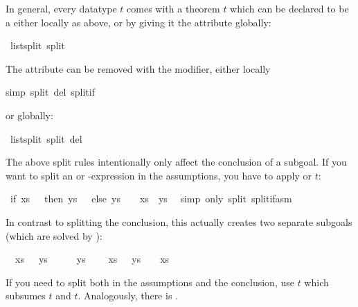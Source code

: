 \begin{isabellebody}
\begin{isamarkuptext}
In general, every datatype $t$ comes with a theorem
$t$ which can be declared to be a  either
locally as above, or by giving it the  attribute globally:%
\end{isamarkuptext}%
\ list{\isachardot}split\ {\isacharbrackleft}split{\isacharbrackright}%
\begin{isamarkuptext}%
\noindent
The  attribute can be removed with the  modifier,
either locally%
\end{isamarkuptext}%
simp\ split\ del{\isacharcolon}\ split{\isacharunderscore}if{\isacharparenright}%
\begin{isamarkuptext}%
\noindent
or globally:%
\end{isamarkuptext}%
\ list{\isachardot}split\ {\isacharbrackleft}split\ del{\isacharbrackright}%
\begin{isamarkuptext}%
The above split rules intentionally only affect the conclusion of a
subgoal.  If you want to split an  or -expression in
the assumptions, you have to apply  or
$t$:%
\end{isamarkuptext}%
\ {\isachardoublequote}if\ xs\ {\isacharequal}\ {\isacharbrackleft}{\isacharbrackright}\ then\ ys\ {\isachartilde}{\isacharequal}\ {\isacharbrackleft}{\isacharbrackright}\ else\ ys\ {\isacharequal}\ {\isacharbrackleft}{\isacharbrackright}\ {\isacharequal}{\isacharequal}{\isachargreater}\ xs\ {\isacharat}\ ys\ {\isachartilde}{\isacharequal}\ {\isacharbrackleft}{\isacharbrackright}{\isachardoublequote}\isanewline
{}simp\ only{\isacharcolon}\ split{\isacharcolon}\ split{\isacharunderscore}if{\isacharunderscore}asm{\isacharparenright}%
\begin{isamarkuptxt}%
\noindent
In contrast to splitting the conclusion, this actually creates two
separate subgoals (which are solved by ):
\begin{isabelle}%
\ {}{\isachardot}\ {\isasymlbrakk}xs\ {\isacharequal}\ {\isacharbrackleft}{\isacharbrackright}{\isacharsemicolon}\ ys\ {\isasymnoteq}\ {\isacharbrackleft}{\isacharbrackright}{\isasymrbrakk}\ {\isasymLongrightarrow}\ {\isacharbrackleft}{\isacharbrackright}\ {\isacharat}\ ys\ {\isasymnoteq}\ {\isacharbrackleft}{\isacharbrackright}\isanewline
\ {}{\isachardot}\ {\isasymlbrakk}xs\ {\isasymnoteq}\ {\isacharbrackleft}{\isacharbrackright}{\isacharsemicolon}\ ys\ {\isacharequal}\ {\isacharbrackleft}{\isacharbrackright}{\isasymrbrakk}\ {\isasymLongrightarrow}\ xs\ {\isacharat}\ {\isacharbrackleft}{\isacharbrackright}\ {\isasymnoteq}\ {\isacharbrackleft}{\isacharbrackright}%
\end{isabelle}
If you need to split both in the assumptions and the conclusion,
use $t$ which subsumes $t$ and
$t$. Analogously, there is .


\end{isamarkuptxt}
\end{isabellebody}
